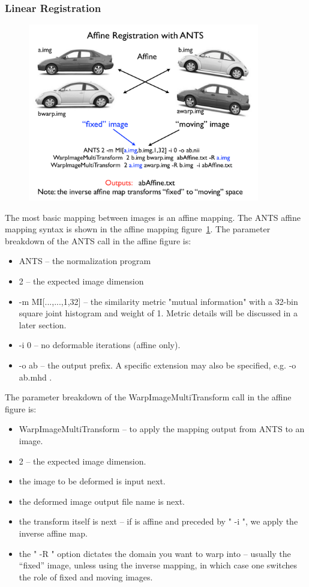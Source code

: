 \documentclass{InsightArticle}
\begin{document}
\subsubsection{Linear Registration}
\begin{figure}
\label{fig:aff}
\includegraphics[width=0.9\textwidth]{./Figures/ANTSanatomy.pdf} 
\vspace{-0.1in}
\end{figure}
The most basic mapping between images is an affine mapping. The ANTS 
affine mapping syntax is shown in the affine mapping figure~\ref{fig:aff}. The
parameter breakdown of the ANTS call in the affine figure is:
\begin{itemize}
\item  ANTS -- the normalization program
\item 2 -- the expected image dimension
\item -m MI[...,...,1,32] -- the similarity metric "mutual information" with a 32-bin square joint histogram and weight of 1.  
Metric details will be discussed in a later section. 
\item -i 0 -- no deformable iterations (affine only).
\item -o ab -- the output prefix.  A specific extension may also be specified, e.g.   -o ab.mhd  .
\end{itemize}
The parameter breakdown of the WarpImageMultiTransform call in the affine figure is:
\begin{itemize}
\item WarpImageMultiTransform -- to apply the mapping output from ANTS to an image.
\item 2 -- the expected image dimension.
\item the image to be deformed is input next.
\item the deformed image output file name is next.
\item the transform itself is next -- if is affine and preceded by " -i ", we apply the inverse affine map.
\item the " -R " option dictates the domain you want to warp into -- usually the ``fixed'' image, unless using the inverse mapping, in which case one switches the role of fixed and moving images. 
\end{itemize}
\end{document}

